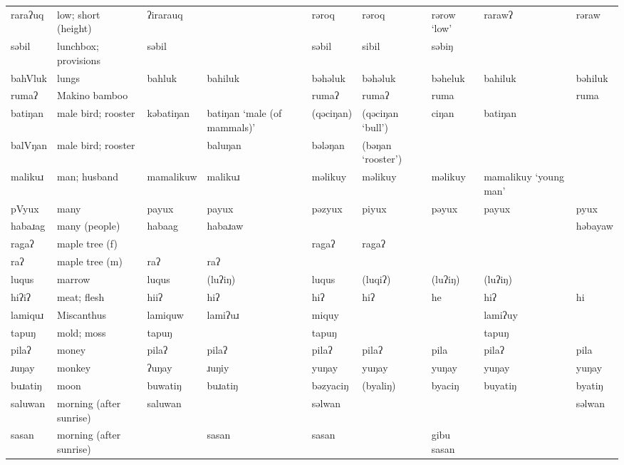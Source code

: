\begin{landscape}
\begin{longtable}{*{9}{>{\raggedright\arraybackslash}p{}}}
\text{*}raraʔuq      & low; short (height) & ʔirarauq &  & rəroq & rəroq & rərow `low' & rarawʔ & rəraw\\
\text{*}səbil        & lunchbox; provisions & səbil &  & səbil & sibil & səbiŋ &  & \\
\text{*}bahVluk      & lungs & bahluk & bahiluk & bəhəluk & bəhəluk & bəheluk & bahiluk & bəhiluk\\
\text{*}rumaʔ        & Makino bamboo &  &  & rumaʔ & rumaʔ & ruma &  & ruma\\
\text{*}batiŋan      & male bird; rooster & kəbatiŋan & batiŋan `male \newline (of mammals)' & (qəciŋan) & (qəciŋan `bull') & ciŋan & batiŋan & \\
\text{*}balVŋan      & male bird; rooster &  & baluŋan & bələŋan & (bəŋan `rooster') &  &  & \\
\text{*}malikuɹ      & man; husband & mamalikuw & malikuɹ & məlikuy & məlikuy & məlikuy & mamalikuy `young man' & \\
\text{*}pVyux        & many & payux & payux & pəzyux & piyux & pəyux & payux & pyux\\
\text{*}habaɹag      & many (people) & habaag & habaɹaw &  &  &  &  & həbayaw\\
\text{*}ragaʔ        & maple tree (f) &  &  & ragaʔ & ragaʔ &  &  & \\
\text{*}raʔ          & maple tree (m) & raʔ & raʔ &  &  &  &  & \\
\text{*}luqus        & marrow & luqus & (luʔiŋ) & luqus & (luqiʔ) & (luʔiŋ) & (luʔiŋ) & \\
\text{*}hiʔiʔ        & meat; flesh & hiiʔ & hiʔ & hiʔ & hiʔ & he & hiʔ & hi\\
\text{*}lamiquɹ      & Miscanthus & lamiquw & lamiʔuɹ & miquy &  &  & lamiʔuy & \\
\text{*}tapuŋ        & mold; moss & tapuŋ &  & tapuŋ &  &  & tapuŋ & \\
\text{*}pilaʔ        & money & pilaʔ & pilaʔ & pilaʔ & pilaʔ & pila & pilaʔ & pila\\
\text{*}ɹuŋay        & monkey & ʔuŋay & ɹuŋiy & yuŋay & yuŋay & yuŋay & yuŋay & yuŋay\\
\text{*}buɹatiŋ      & moon & buwatiŋ & buɹatiŋ & bəzyaciŋ & (byaliŋ) & byaciŋ & buyatiŋ & byatiŋ\\
\text{*}saluwan      & morning (after sunrise) & saluwan &  & səlwan &  &  &  & səlwan\\
\text{*}sasan        & morning (after sunrise) &  & sasan & sasan &  & gibu sasan &  & \\

\end{longtable}
\end{landscape}
